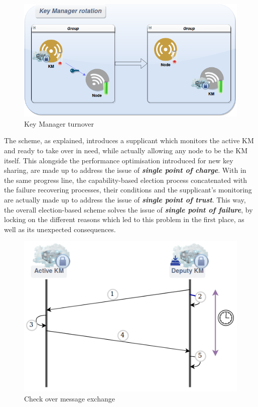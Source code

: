 \begin{figure}[htbp]
	\centerline{\includegraphics[scale=0.50]{figures/rotation.png}}
	\caption{Key Manager turnover}
	\label{fig:km_turnover}
\end{figure}

The scheme, as explained, introduces a supplicant which monitors the active KM and ready to take over in need, while actually allowing any node to be the KM itself. This alongside the performance optimisation introduced for new key sharing, are made up to address the issue of \textit{\textbf{single point of charge}}. With in the same progress line, the capability-based election process concatenated with the failure recovering processes, their conditions and the supplicant’s monitoring are actually made up to address the issue of \textit{\textbf{single point of trust}}. This way, the overall election-based scheme solves the issue of \textit{\textbf{single point of failure}}, by locking on the different reasons which led to this problem in the first place, as well as its unexpected consequences.

\begin{figure}[htbp]
	\centerline{\includegraphics[scale=0.50]{figures/check_over.png}}
	\caption{Check over message exchange}
	\label{fig:double_check_exchange}
\end{figure}


